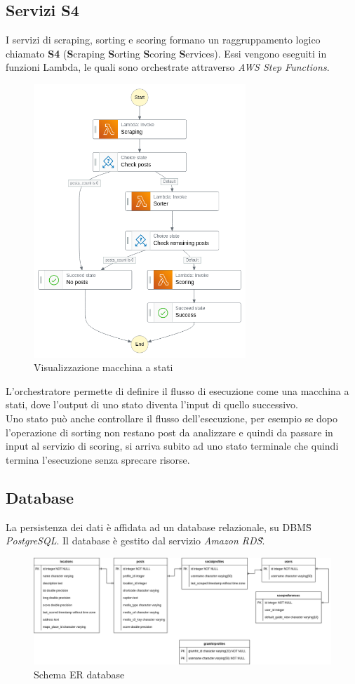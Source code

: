 \subsection{Servizi S4}
I servizi di scraping, sorting e scoring formano un raggruppamento logico chiamato \textbf{S4} (\textbf{S}craping \textbf{S}orting \textbf{S}coring \textbf{S}ervices).
Essi vengono eseguiti in funzioni Lambda, le quali sono orchestrate attraverso \textit{AWS Step Functions}.
\begin{figure}[H]
    \includegraphics[width=8cm]{sezioni/images/stepfunctions_graph.png}
    \centering
    \caption{Visualizzazione macchina a stati}
\end{figure}
L'orchestratore permette di definire il flusso di esecuzione come una macchina a stati, dove l'output di uno stato
diventa l'input di quello successivo.\\
Uno stato può anche controllare il flusso dell'esecuzione, per esempio se dopo
l'operazione di sorting non restano post da analizzare e quindi da passare in input al servizio di scoring, si arriva
subito ad uno stato terminale che quindi termina l'esecuzione senza sprecare risorse.

\newpage

\subsection{Database}
La persistenza dei dati è affidata ad un database relazionale, su DBMS\G{} \textit{PostgreSQL}.
Il database è gestito dal servizio \textit{Amazon RDS}\G.
\begin{figure}[H]
    \includegraphics[width=15cm]{sezioni/images/db_er.png}
    \centering
    \caption{Schema ER database}
\end{figure}

